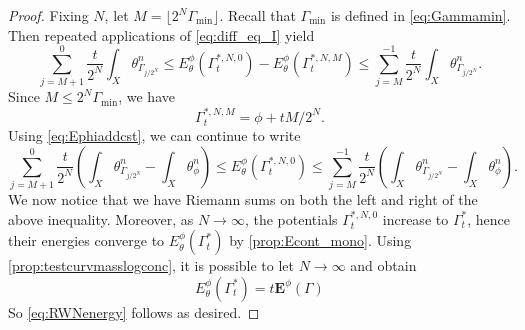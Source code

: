\begin{proof}
    Fixing $N$, let $M=\lfloor 2^{N}\Gamma_{\min}\rfloor$. Recall that $\Gamma_{\min}$ is defined in \eqref{eq:Gammamin}.
    Then repeated applications of \eqref{eq:diff_eq_I} yield
    \[
        \sum_{j=M+1}^0 \frac{t}{2^N} \int_X \theta^n_{\Gamma_{j/2^N}}\leq E^{\phi}_{\theta}\left(\Gamma_t^{*,N,0}\right)-E^{\phi}_{\theta}\left(\Gamma_t^{*,N,M}\right)\leq \sum_{j=M}^{-1} \frac{t}{2^N} \int_X \theta^n_{\Gamma_{j/2^N}}.
    \]
    Since $M \leq 2^{N}\Gamma_{\min}$, we have
    \[
    \Gamma^{*,N,M}_t =\phi+t M/2^N.
    \]
    Using \eqref{eq:Ephiaddcst}, we can continue to write
    \[
        \sum_{j=M+1}^0 \frac{t}{2^N} \left(\int_X \theta^n_{\Gamma_{j/2^N}} - \int_X \theta^n_{\phi}\right)\leq E_{\theta}^{\phi}\left(\Gamma_t^{*,N,0}\right)\leq \sum_{j=M}^{-1} \frac{t}{2^N} \left(\int_X \theta^n_{\Gamma_{j/2^N}} - \int_X \theta^n_{\phi}\right).
    \]
We now notice that we have Riemann sums on both the left and right of the above inequality. Moreover, as $N\to\infty$, the potentials $\Gamma_t^{*,N,0}$ increase to $\Gamma_t^*$, hence their energies converge to $E^\phi_\theta(\Gamma_t^*)$ by \cref{prop:Econt_mono}. Using \cref{prop:testcurvmasslogconc}, it is possible to let $N \to \infty$ and obtain
\begin{equation}\label{eq:EGammastartt}
E_{\theta}^{\phi}(\Gamma_t^{*})=t\mathbf{E}^{\phi}(\Gamma)
\end{equation}
So \eqref{eq:RWNenergy} follows as desired.



\end{proof}
